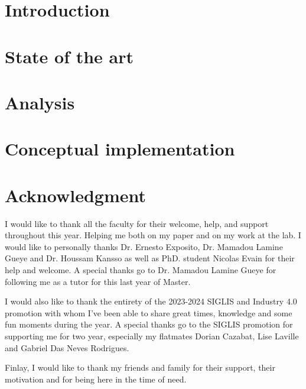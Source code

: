 \documentclass[conference]{IEEEtran}
\begin{document}
\section{Introduction}
\label{sec:introduction}  


\section{State of the art}
\label{sec:soa}



\section{Analysis}
\label{sec:analysis}



\section{Conceptual implementation}
\label{sec:conceptualanalysis}


\vspace{16pt}
\section{Acknowledgment}
I would like to thank all the faculty for their welcome, help, and support throughout this year. Helping me both on my paper and on my work at the lab. I would like to personally thanks Dr. Ernesto Exposito, Dr. Mamadou Lamine Gueye and Dr. Houssam Kansso as well as PhD. student Nicolas Evain for their help and welcome. A special thanks go to Dr. Mamadou Lamine Gueye for following me as a tutor for this last year of Master.

I would also like to thank the entirety of the 2023-2024 SIGLIS and Industry 4.0 promotion with whom I've been able to share great times, knowledge and some fun moments during the year. A special thanks go to the SIGLIS promotion for supporting me for two year, especially my flatmates Dorian Cazabat, Lise Laville and Gabriel Das Neves Rodrigues. 

Finlay, I would like to thank my friends and family for their support, their motivation and for being here in the time of need.
\vspace{12pt}



\printglossary
\end{document}
